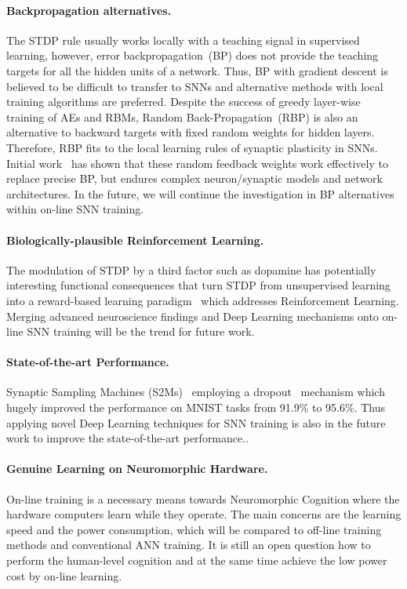 \paragraph{Backpropagation alternatives.}
The STDP rule usually works locally with a teaching signal in supervised learning, however, error backpropagation~(BP) does not provide the teaching targets for all the hidden units of a network.
Thus, BP with gradient descent is believed to be difficult to transfer to SNNs and alternative methods with local training algorithms are preferred.
Despite the success of greedy layer-wise training of AEs and RBMs, Random Back-Propagation~(RBP) is also an alternative to backward targets with fixed random weights for hidden layers.
Therefore, RBP fits to the local learning rules of synaptic plasticity in SNNs.
Initial work~\citep{samadi2017deep,neftci2017event} has shown that these random feedback weights work effectively to replace precise BP, but endures complex neuron/synaptic models and network architectures.
In the future, we will continue the investigation in BP alternatives within on-line SNN training.

\paragraph{Biologically-plausible Reinforcement Learning.}
The modulation of STDP by a third factor such as dopamine has potentially interesting functional consequences that turn STDP from unsupervised learning into a reward-based learning paradigm~\citep{izhikevich2007solving} which addresses Reinforcement Learning.
Merging advanced neuroscience findings and Deep Learning mechanisms onto on-line SNN training will be the trend for future work.


\paragraph{State-of-the-art Performance.}
Synaptic Sampling Machines (S2Ms)~\citep{neftci2016stochastic} employing a dropout~\citep{srivastava2014dropout} mechanism which hugely improved the performance on MNIST tasks from 91.9\% to 95.6\%.
Thus applying novel Deep Learning techniques for SNN training is also in the future work to improve the state-of-the-art performance..

\paragraph{Genuine Learning on Neuromorphic Hardware.}
On-line training is a necessary means towards Neuromorphic Cognition where the hardware computers learn while they operate.
The main concerns are the learning speed and the power consumption, which will be compared to off-line training methods and conventional ANN training.
It is still an open question how to perform the human-level cognition and at the same time achieve the low power cost by on-line learning.



